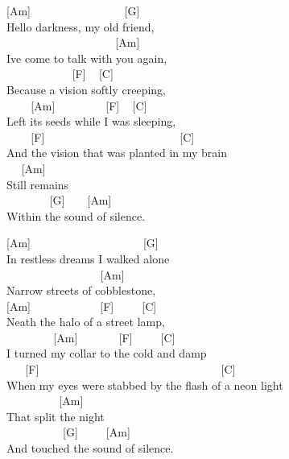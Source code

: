 \documentclass[
  letterpaper,
  twoside=false]{scrbook}
\begin{document}
{[}Am{]} ~ ~ ~ ~ ~ ~ ~ ~ ~ ~{[}G{]}\\
Hello darkness, my old friend,\\
\hspace*{0.333em} ~ ~ ~ ~ ~ ~ ~ ~ ~ ~ ~ ~{[}Am{]}\\
I\textquotesingle ve come to talk with you again,\\
\hspace*{0.333em} ~ ~ ~ ~ ~ ~ ~ {[}F{]} ~ {[}C{]} ~ ~ ~ ~\\
Because a vision softly creeping,\\
\hspace*{0.333em} ~ ~ ~{[}Am{]} ~ ~ ~ ~ ~ {[}F{]} ~ {[}C{]} ~ ~ ~ ~ ~ ~
~ ~\\
Left its seeds while I was sleeping,\\
\hspace*{0.333em} ~ ~ ~{[}F{]} ~ ~ ~ ~ ~ ~ ~ ~ ~ ~ ~ ~ ~ ~ {[}C{]} ~\\
And the vision that was planted in my brain\\
\hspace*{0.333em} ~ ~{[}Am{]} ~ ~ ~\\
Still remains\\
\hspace*{0.333em} ~ ~ ~ ~ ~{[}G{]} ~ ~ {[}Am{]} ~ ~ ~ ~ ~ ~ ~\\
Within the sound of silence.

{[}Am{]} ~ ~ ~ ~ ~ ~ ~ ~ ~ ~ ~ ~{[}G{]} ~ ~ ~ ~\\
In restless dreams I walked alone\\
\hspace*{0.333em} ~ ~ ~ ~ ~ ~ ~ ~ ~ ~ {[}Am{]}\\
Narrow streets of cobblestone,\\
{[}Am{]} ~ ~ ~ ~ ~ ~ ~ {[}F{]} ~ ~ ~{[}C{]}\\
\textquotesingle Neath the halo of a street lamp,\\
\hspace*{0.333em} ~ ~ ~ ~ ~ {[}Am{]} ~ ~ ~ ~ {[}F{]} ~ ~ ~{[}C{]}\\
I turned my collar to the cold and damp\\
\hspace*{0.333em} ~ ~ {[}F{]} ~ ~ ~ ~ ~ ~ ~ ~ ~ ~ ~ ~ ~ ~ ~ ~ ~ ~ ~
{[}C{]} ~ ~\\
When my eyes were stabbed by the flash of a neon light\\
\hspace*{0.333em} ~ ~ ~ ~ ~ ~{[}Am{]}\\
That split the night\\
\hspace*{0.333em} ~ ~ ~ ~ ~ ~ {[}G{]} ~ ~ ~{[}Am{]}\\
And touched the sound of silence.
\end{document}
